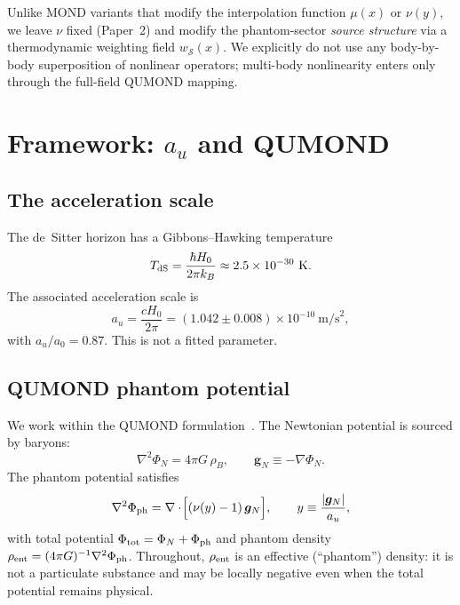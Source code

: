 \documentclass[aps,prd,twocolumn,superscriptaddress,nofootinbib]{revtex4-2}
\newcommand{\au}{a_u}
\newcommand{\gN}{\bm{g}_N}
\newcommand{\Ph}{\Phi_{\rm ph}}
\newcommand{\PN}{\Phi_{N}}
\newcommand{\rhob}{\rho_B}
\newcommand{\rhoent}{\rho_{\rm ent}}
\newcommand{\wS}{w_{\mathcal{S}}}
\begin{document}
Unlike MOND variants that modify the interpolation function $\mu(x)$ or $\nu(y)$, we leave $\nu$ fixed (Paper~2) and modify the phantom-sector \emph{source structure} via a thermodynamic weighting field $\wS(x)$. We explicitly do not use any body-by-body superposition of nonlinear operators; multi-body nonlinearity enters only through the full-field QUMOND mapping.

\section{Framework: $\au$ and QUMOND}
\label{sec:framework}

\subsection{The acceleration scale}

The de~Sitter horizon has a Gibbons--Hawking temperature~\cite{Gibbons1977}
\begin{equation}
T_{\rm dS}=\frac{\hbar H_0}{2\pi k_B}\approx 2.5\times 10^{-30}~\text{K}.
\label{eq:TdS}
\end{equation}
The associated acceleration scale is
\begin{equation}
\au=\frac{cH_0}{2\pi}=(1.042\pm 0.008)\times 10^{-10}~\text{m/s}^2,
\label{eq:au}
\end{equation}
with $\au/a_0=0.87$. This is not a fitted parameter.

\subsection{QUMOND phantom potential}

We work within the QUMOND formulation~\cite{Milgrom2010}. The Newtonian potential is sourced by baryons:
\begin{equation}
\nabla^2\PN=4\pi G\,\rhob,\qquad \gN\equiv-\nabla\PN.
\label{eq:poissonN}
\end{equation}
The phantom potential satisfies
\begin{equation}
\nabla^2\Ph=\nabla\cdot\!\Big[(\nu(y)-1)\,\gN\Big],\qquad y\equiv\frac{|\gN|}{\au},
\label{eq:qumond}
\end{equation}
with total potential $\Phi_{\rm tot}=\PN+\Ph$ and phantom density $\rhoent=(4\pi G)^{-1}\nabla^2\Ph$. Throughout, $\rhoent$ is an effective (``phantom'') density: it is not a particulate substance and may be locally negative even when the total potential remains physical.
\end{document}
